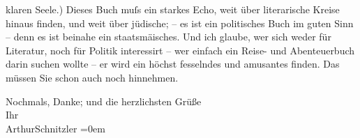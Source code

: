                klaren Seele.) Dieses Buch
               muſs ein starkes Echo, weit über literarische Kreise hinaus finden, und weit über
               jüdische; – es ist ein politisches Buch im guten Sinn – denn es ist beinahe ein
                  staatsmä{\geminationn}isches. Und ich glaube, wer sich weder für
               Literatur, noch {\pb}für Politik interessirt –
               wer einfach ein Reise- und Abenteuerbuch darin \strikeout{\textcolor{gray}{finden}} suchen wollte – er wird ein höchst fesselndes und amusantes \strikeout{\textcolor{gray}{darin}} finden. Das müssen Sie schon
               auch noch hinnehmen.\pend
           
\pstart
           Nochmals, Danke; und die herzlichsten Grüße {\\[\baselineskip]}Ihr {\\[\baselineskip]}\spacefill\mbox{ArthurSchnitzler}\pend
           \leftskip=0em{}\endnumbering{}  \newcommand{\dateiname}{L03021}\newcommand{\titel}{Arthur Schnitzler an Felix Salten, 6. 5. 1925}\newcommand{\editorInnen}{Martin Anton Müller und Laura Untner}
